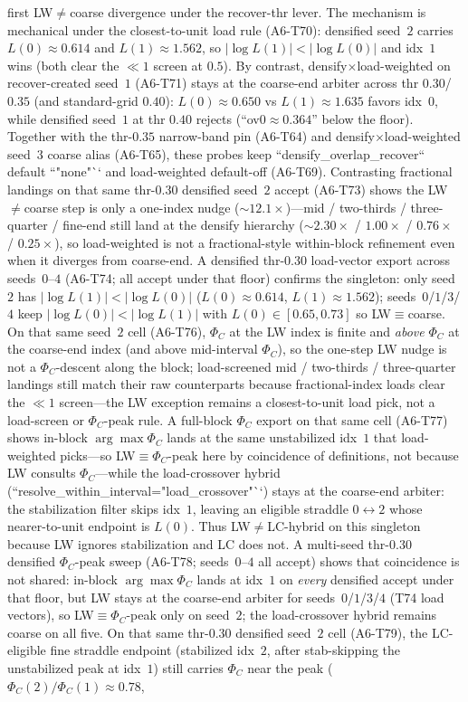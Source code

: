 \documentclass[11pt]{article}
\theoremstyle{definition}
\theoremstyle{plain}
\begin{document}
first LW$\neq$coarse divergence under the recover-thr lever. The mechanism is mechanical under the closest-to-unit load rule (A6-T70): densified seed~$2$ carries $L(0)\approx 0.614$ and $L(1)\approx 1.562$, so $\lvert\log L(1)\rvert < \lvert\log L(0)\rvert$ and idx~$1$ wins (both clear the $\ll 1$ screen at $0.5$). By contrast, densify$\times$load-weighted on recover-created seed~$1$ (A6-T71) stays at the coarse-end arbiter across thr $0.30$/$0.35$ (and standard-grid $0.40$): $L(0)\approx 0.650$ vs $L(1)\approx 1.635$ favors idx~$0$, while densified seed~$1$ at thr $0.40$ rejects (``ov0$\approx 0.364$'' below the floor). Together with the thr-$0.35$ narrow-band pin (A6-T64) and densify$\times$load-weighted seed~$3$ coarse alias (A6-T65), these probes keep ``densify_overlap_recover`` default ``"none"`` and load-weighted default-off (A6-T69). Contrasting fractional landings on that same thr-$0.30$ densified seed~$2$ accept (A6-T73) shows the LW$\neq$coarse step is only a one-index nudge ($\sim 12.1\times$)---mid / two-thirds / three-quarter / fine-end still land at the densify hierarchy ($\sim 2.30\times$ / $1.00\times$ / $0.76\times$ / $0.25\times$), so load-weighted is not a fractional-style within-block refinement even when it diverges from coarse-end. A densified thr-$0.30$ load-vector export across seeds~$0$--$4$ (A6-T74; all accept under that floor) confirms the singleton: only seed~$2$ has $\lvert\log L(1)\rvert < \lvert\log L(0)\rvert$ ($L(0)\approx 0.614$, $L(1)\approx 1.562$); seeds~$0$/$1$/$3$/$4$ keep $\lvert\log L(0)\rvert < \lvert\log L(1)\rvert$ with $L(0)\in[0.65,0.73]$ so LW$\equiv$coarse. On that same seed~$2$ cell (A6-T76), $\Phi_C$ at the LW index is finite and \emph{above} $\Phi_C$ at the coarse-end index (and above mid-interval $\Phi_C$), so the one-step LW nudge is not a $\Phi_C$-descent along the block; load-screened mid / two-thirds / three-quarter landings still match their raw counterparts because fractional-index loads clear the $\ll 1$ screen---the LW exception remains a closest-to-unit load pick, not a load-screen or $\Phi_C$-peak rule. A full-block $\Phi_C$ export on that same cell (A6-T77) shows in-block $\arg\max\Phi_C$ lands at the same unstabilized idx~$1$ that load-weighted picks---so LW$\equiv\Phi_C$-peak here by coincidence of definitions, not because LW consults $\Phi_C$---while the load-crossover hybrid (``resolve_within_interval="load_crossover"``) stays at the coarse-end arbiter: the stabilization filter skips idx~$1$, leaving an eligible straddle $0\leftrightarrow 2$ whose nearer-to-unit endpoint is $L(0)$. Thus LW$\neq$LC-hybrid on this singleton because LW ignores stabilization and LC does not. A multi-seed thr-$0.30$ densified $\Phi_C$-peak sweep (A6-T78; seeds~$0$--$4$ all accept) shows that coincidence is not shared: in-block $\arg\max\Phi_C$ lands at idx~$1$ on \emph{every} densified accept under that floor, but LW stays at the coarse-end arbiter for seeds~$0$/$1$/$3$/$4$ (T74 load vectors), so LW$\equiv\Phi_C$-peak only on seed~$2$; the load-crossover hybrid remains coarse on all five. On that same thr-$0.30$ densified seed~$2$ cell (A6-T79), the LC-eligible fine straddle endpoint (stabilized idx~$2$, after stab-skipping the unstabilized peak at idx~$1$) still carries $\Phi_C$ near the peak ($\Phi_C(2)/\Phi_C(1)\approx 0.78$, 
\end{document}
